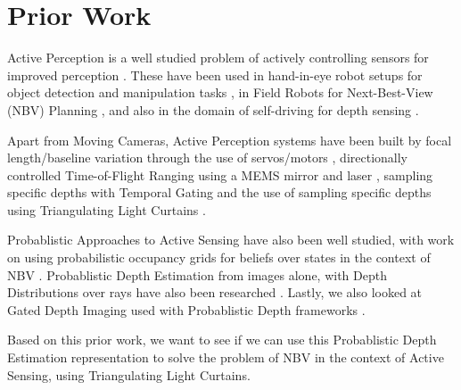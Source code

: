 \section{Prior Work}

Active Perception is a well studied problem of actively controlling sensors for improved perception \cite{bajcsy1988active} \cite{wilkes1994active} \cite{DBLP:journals/corr/BajcsyAT16} \cite{DBLP:journals/corr/abs-1811-08067}. These have been used in hand-in-eye robot setups for object detection and manipulation tasks \cite{sergey2017} \cite{7759446}, in Field Robots for Next-Best-View (NBV) Planning \cite{coslam2012} \cite{8098709} \cite{7989679}, and also in the domain of self-driving for depth sensing \cite{Ancha_2020_ECCV} \cite{9105252}.

Apart from Moving Cameras, Active Perception systems have been built by focal length/baseline variation through the use of servos/motors \cite{Mohamed2018ActiveSP} \cite{4587671} \cite{Nakabo2005VariableBS} \cite{Schneider2018VisuallyGV}, directionally controlled Time-of-Flight Ranging using a MEMS mirror and laser \cite{dtof} \cite{9105183} \cite{pittaluga2020} \cite{8369664}, sampling specific depths with Temporal Gating \cite{10.1117/12.2078169} and the use of sampling specific depths using Triangulating Light Curtains \cite{bartels2019Agile} \cite{wang2018programmable}.

Probablistic Approaches to Active Sensing have also been well studied, with work on using probabilistic occupancy grids for beliefs over states in the context of NBV \cite{isler2016information} \cite{kriegel2015efficient} \cite{8369664} \cite{Ancha_2020_ECCV} \cite{daudelin2017adaptable}. Probablistic Depth Estimation from images alone, with Depth Distributions over rays have also been researched \cite{liu2019neural} \cite{yang2019inferring} \cite{chang2018pyramid}. Lastly, we also looked at Gated Depth Imaging used with Probablistic Depth frameworks \cite{walz2020uncertainty} \cite{gruber2019gated2depth}.

Based on this prior work, we want to see if we can use this Probablistic Depth Estimation representation to solve the problem of NBV in the context of Active Sensing, using Triangulating Light Curtains.